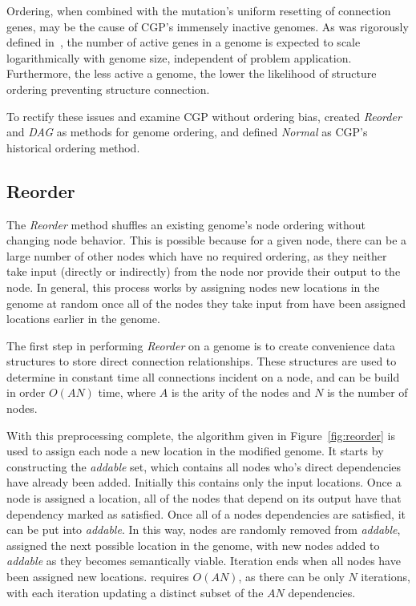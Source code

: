 \documentclass[journal]{IEEEtran}
\begin{document}
Ordering, when combined with the mutation's uniform resetting of connection genes, may be the cause of CGP's
immensely inactive genomes.  As was rigorously defined in~\cite{goldman:2013:ordering},
the number of active genes in a genome is expected to scale logarithmically
with genome size, independent of problem application.  Furthermore, the less
active a genome, the lower the likelihood of structure ordering preventing structure
connection.

To rectify these issues and examine CGP without ordering bias, \cite{goldman:2013:ordering}
created \emph{Reorder} and \emph{DAG} as methods for genome ordering, and defined
\emph{Normal} as CGP's historical ordering method.

\subsection{Reorder}
\label{sec:reorder}
The \emph{Reorder} method shuffles an existing genome's node ordering without
changing node behavior.  This is possible because for a given node, there can
be a large number of other nodes which have no required ordering,
as they neither take input (directly or indirectly) from the node nor provide their
output to the node.  In general, this process works by assigning nodes new
locations in the genome at random once all of the nodes they take input from have been assigned
locations earlier in the genome.

The first step in performing \emph{Reorder} on a genome is to create convenience
data structures to store direct connection relationships.  These structures are used
to determine in constant time all connections incident on a node, and 
can be build in order $O(AN)$ time, where $A$ is the arity of the nodes
and $N$ is the number of nodes.

With this preprocessing complete, the  algorithm given in Figure~\ref{fig:reorder}
is used to assign each node a new location in the modified genome.
It starts by constructing the \emph{addable} set, which contains all nodes who's direct
dependencies have already been added.  Initially this contains only the input locations.
Once a node is assigned a location, all of the nodes that depend on its output
have that dependency marked as satisfied.  Once all of a nodes dependencies
are satisfied, it can be put into \emph{addable}.  In this way, nodes are
randomly removed from \emph{addable}, assigned the next possible location
in the genome, with new nodes added to \emph{addable} as they becomes semantically
viable.  Iteration ends when all nodes have been assigned new locations.
 requires $O(AN)$, as there can be only $N$ iterations,
with each iteration updating a distinct subset of the $AN$ dependencies.
\end{document}
